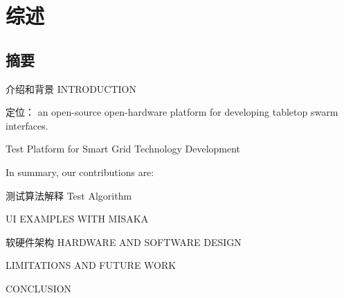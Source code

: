 \chapter{综述}
\label{cha:Overview}

\section{摘要}

介绍和背景 INTRODUCTION

定位： an open-source open-hardware platform for developing tabletop swarm interfaces.

Test Platform for Smart Grid Technology Development

In summary, our contributions are:


测试算法解释 Test Algorithm

UI EXAMPLES WITH MISAKA

软硬件架构 HARDWARE AND SOFTWARE DESIGN

LIMITATIONS AND FUTURE WORK

CONCLUSION